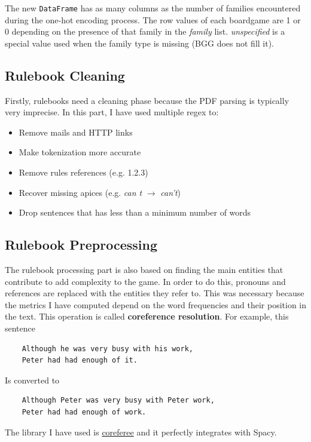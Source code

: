 \documentclass[runningheads]{llncs}
\begin{document}
The new \verb|DataFrame| has as many columns as the number of families encountered during the one-hot encoding process. The row values of each boardgame are 1 or 0 depending on the presence of that family in the \textit{family} list. \textit{unspecified} is a special value used when the family type is missing (BGG does not fill it).

\subsection{Rulebook Cleaning}
Firstly, rulebooks need a cleaning phase because the PDF parsing is typically very imprecise. In this part, I have used multiple regex to:
 
\begin{itemize}
    \item Remove mails and HTTP links
    \item Make tokenization more accurate 
    \item Remove rules references (e.g. 1.2.3)
    \item Recover missing apices (e.g. \textit{can t} $\rightarrow$ \textit{can't})
    \item Drop sentences that has less than a minimum number of words
\end{itemize}

\subsection{Rulebook Preprocessing}
The rulebook processing part is also based on finding the main entities that contribute to add complexity to the game. In order to do this, pronouns and references are replaced with the entities they refer to. This was necessary because the metrics I have computed depend on the word frequencies and their position in the text. This operation is called \textbf{coreference resolution}. For example, this sentence

\begin{verbatim}
    Although he was very busy with his work,
    Peter had had enough of it.
\end{verbatim}

\noindent Is converted to

\begin{verbatim}
    Although Peter was very busy with Peter work, 
    Peter had had enough of work.
\end{verbatim}

\noindent The library I have used is \href{https://explosion.ai/blog/coref}{coreferee} and it perfectly integrates with Spacy.
\end{document}
